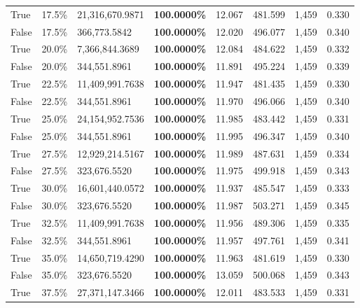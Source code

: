 \begin{table}[H]
\begin{tabular}{lllrllll}
\cline{1-8}
True & 17.5\% & 21,316,670.9871 & \bfseries \color{red} 100.0000\% & 12.067 & 481.599 & 1,459 & 0.330 \\
\cline{1-8}
False & 17.5\% & 366,773.5842 & \bfseries \color{red} 100.0000\% & 12.020 & 496.077 & 1,459 & 0.340 \\
\cline{1-8}
True & 20.0\% & 7,366,844.3689 & \bfseries \color{red} 100.0000\% & 12.084 & 484.622 & 1,459 & 0.332 \\
\cline{1-8}
False & 20.0\% & 344,551.8961 & \bfseries \color{red} 100.0000\% & 11.891 & 495.224 & 1,459 & 0.339 \\
\cline{1-8}
True & 22.5\% & 11,409,991.7638 & \bfseries \color{red} 100.0000\% & 11.947 & 481.435 & 1,459 & 0.330 \\
\cline{1-8}
False & 22.5\% & 344,551.8961 & \bfseries \color{red} 100.0000\% & 11.970 & 496.066 & 1,459 & 0.340 \\
\cline{1-8}
True & 25.0\% & 24,154,952.7536 & \bfseries \color{red} 100.0000\% & 11.985 & 483.442 & 1,459 & 0.331 \\
\cline{1-8}
False & 25.0\% & 344,551.8961 & \bfseries \color{red} 100.0000\% & 11.995 & 496.347 & 1,459 & 0.340 \\
\cline{1-8}
True & 27.5\% & 12,929,214.5167 & \bfseries \color{red} 100.0000\% & 11.989 & 487.631 & 1,459 & 0.334 \\
\cline{1-8}
False & 27.5\% & 323,676.5520 & \bfseries \color{red} 100.0000\% & 11.975 & 499.918 & 1,459 & 0.343 \\
\cline{1-8}
True & 30.0\% & 16,601,440.0572 & \bfseries \color{red} 100.0000\% & 11.937 & 485.547 & 1,459 & 0.333 \\
\cline{1-8}
False & 30.0\% & 323,676.5520 & \bfseries \color{red} 100.0000\% & 11.987 & 503.271 & 1,459 & 0.345 \\
\cline{1-8}
True & 32.5\% & 11,409,991.7638 & \bfseries \color{red} 100.0000\% & 11.956 & 489.306 & 1,459 & 0.335 \\
\cline{1-8}
False & 32.5\% & 344,551.8961 & \bfseries \color{red} 100.0000\% & 11.957 & 497.761 & 1,459 & 0.341 \\
\cline{1-8}
True & 35.0\% & 14,650,719.4290 & \bfseries \color{red} 100.0000\% & 11.963 & 481.619 & 1,459 & 0.330 \\
\cline{1-8}
False & 35.0\% & 323,676.5520 & \bfseries \color{red} 100.0000\% & 13.059 & 500.068 & 1,459 & 0.343 \\
\cline{1-8}
True & 37.5\% & 27,371,147.3466 & \bfseries \color{red} 100.0000\% & 12.011 & 483.533 & 1,459 & 0.331 \\

\end{tabular}
\end{table}
